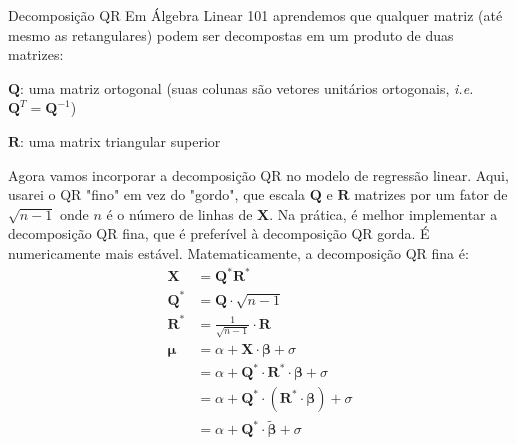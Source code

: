 \documentclass[aspectratio=169]{beamer}                    %
\begin{document}
\begin{frame}[plain, noframenumbering, label=appendixnqr]{Decomposição QR}
  \footnotesize
  Em Álgebra Linear 101 aprendemos que qualquer matriz
  (até mesmo as retangulares) podem ser decompostas em um produto de duas matrizes:
  \begin{vfilleditems}
    \footnotesize
    \item $\mathbf{Q}$: uma matriz ortogonal (suas colunas são vetores unitários
    ortogonais, \textit{i.e.} $\mathbf{Q}^T = \mathbf{Q}^{-1}$)
    \item $\mathbf{R}$: uma matrix triangular superior
  \end{vfilleditems}
  \footnotesize
  Agora vamos incorporar a decomposição QR no modelo de regressão linear.
  Aqui, usarei o QR "fino" em vez do "gordo", que escala $\mathbf{Q}$ e $\mathbf{R}$
  matrizes por um fator de $\sqrt{n-1}$ onde $n$ é o número de linhas de $\mathbf{X}$.
  Na prática, é melhor implementar a decomposição QR fina, que é preferível à decomposição QR gorda.
  É numericamente mais estável. Matematicamente, a decomposição QR fina é:
  $$
  \begin{aligned}
  \mathbf{X}       &= \mathbf{Q}^* \mathbf{R}^* \\
  \mathbf{Q}^*     &= \mathbf{Q} \cdot \sqrt{n - 1} \\
  \mathbf{R}^*     &= \frac{1}{\sqrt{n - 1}} \cdot \mathbf{R}\\
  \boldsymbol{\mu} &= \alpha + \mathbf{X} \cdot \boldsymbol{\beta} + \sigma \\
                   &= \alpha + \mathbf{Q}^* \cdot \mathbf{R}^* \cdot \boldsymbol{\beta} + \sigma \\
                   &= \alpha + \mathbf{Q}^* \cdot (\mathbf{R}^* \cdot \boldsymbol{\beta}) + \sigma \\
                   &= \alpha + \mathbf{Q}^* \cdot \widetilde{\boldsymbol{\beta}} + \sigma
  \end{aligned}
  $$
\end{frame}
\end{document}
